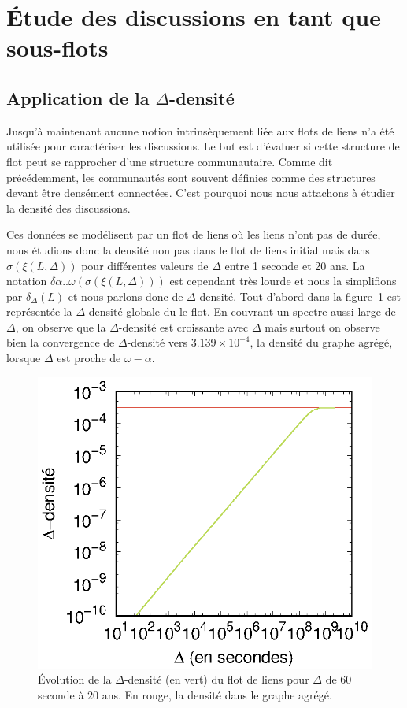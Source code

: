 \section{\'Etude des discussions en tant que sous-flots}
\label{etude_discussion}
\subsection{Application de la \texorpdfstring{$\Delta$}{delta}-densité}
\label{delta_densite}

Jusqu'à maintenant aucune notion intrinsèquement liée aux flots de liens n'a été utilisée pour caractériser les discussions.
Le but est d'évaluer si cette structure de flot peut se rapprocher d'une structure communautaire.
Comme dit précédemment, les communautés sont souvent définies comme des structures devant être densément connectées.
C'est pourquoi nous nous attachons à étudier la densité des discussions.

Ces données se modélisent par un flot de liens où les liens n'ont pas de durée, nous étudions donc la densité non pas dans le flot de liens initial mais dans $\sigma(\xi(L,\Delta))$ pour différentes valeurs de $\Delta$ entre 1 seconde et 20 ans.
La notation $\delta{\alpha..\omega}(\sigma(\xi(L,\Delta)))$ est cependant très lourde et nous la simplifions par $\delta_{\Delta}(L)$ et nous parlons donc de $\Delta$-densité.
Tout d'abord dans la figure~\ref{fig:dens_fil_discusion} est représentée la $\Delta$-densité globale du le flot.
En couvrant un spectre aussi large de $\Delta$, on observe que la $\Delta$-densité est croissante avec $\Delta$ mais surtout on observe bien la convergence de $\Delta$-densité vers $3.139\times 10^{-4}$, la densité du graphe agrégé, lorsque $\Delta$ est proche de $\omega - \alpha$.

\begin{figure}[h]
	\centering
	\includegraphics[width=0.4\linewidth]{img/mailing/global_loglog.eps}
	\caption{Évolution de la $\Delta$-densité (en vert) du flot de liens pour $\Delta$ de $60$ seconde à $20$ ans. En rouge, la densité dans le graphe agrégé.}
	\label{fig:dens_fil_discusion}
\end{figure}

